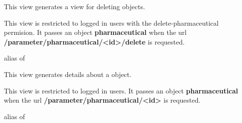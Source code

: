 \documentclass[letterpaper,10pt,english]{sphinxmanual}
\begin{document}
\begin{fulllineitems}
\label{data:mousedb.data.views.PharmaceuticalDelete}
This view generates a view for deleting {\hyperref[data:mousedb.data.models.Pharmaceutical]{}} objects.

This view is restricted to logged in users with the delete-pharmaceutical permision. 
It passes an object \textbf{pharmaceutical} when the url \textbf{/parameter/pharmaceutical/\textless{}id\textgreater{}/delete} is requested.

\begin{fulllineitems}
\label{data:mousedb.data.views.PharmaceuticalDelete.model}
alias of 

\end{fulllineitems}


\end{fulllineitems}


\begin{fulllineitems}
\label{data:mousedb.data.views.PharmaceuticalDetail}
This view generates details about a {\hyperref[data:mousedb.data.models.Pharmaceutical]{}} object.

This view is restricted to logged in users.
It passes an object \textbf{pharmaceutical} when the url \textbf{/parameter/pharmaceutical/\textless{}id\textgreater{}} is requested.

\begin{fulllineitems}
\label{data:mousedb.data.views.PharmaceuticalDetail.model}
alias of 

\end{fulllineitems}


\end{fulllineitems}

\end{document}
